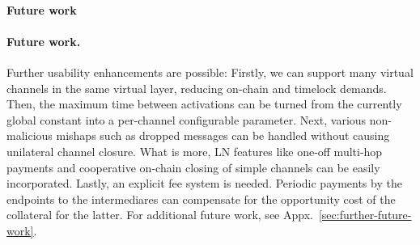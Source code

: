 \makeatletter%
%
  {\paragraph{Future work}}%
  {\paragraph{Future work.}}%
\makeatother%
  Further usability enhancements are possible: Firstly, we can
  support many virtual channels in the same virtual layer, reducing on-chain
  and timelock demands. Then, the maximum time between
  activations can be turned from the currently global constant into a
  per-channel configurable parameter. Next, various non-malicious mishaps
  such as dropped messages can be handled without causing unilateral
  channel closure. What is more, LN features like one-off multi-hop payments and
  cooperative on-chain closing of simple channels can be easily
  incorporated.
  Lastly, an explicit fee system is needed. Periodic payments by the
  endpoints to the
  intermediares can compensate for the opportunity cost of the collateral for
  the latter.
  For additional future work, see Appx.~\ref{sec:further-future-work}.

